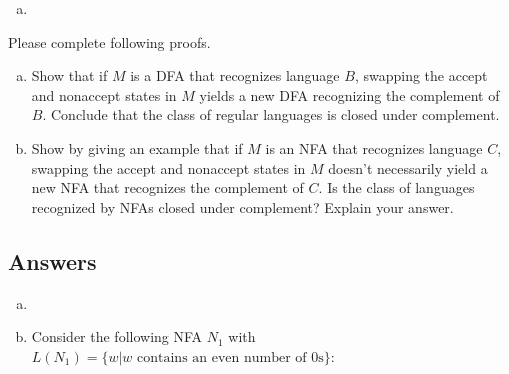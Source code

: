 \documentclass[10pt, legalpaper]{exam}
\begin{document}
\begin{questions}
\begin{enumerate}[(a)]
\begin{tikzpicture}[->,
            >=latex,
            auto,
            node distance=2.5cm,
            semithick,
            baseline=(top.base)]
    \end{tikzpicture}
    
    \item {}    
\end{enumerate}

\newpage
\addpoints
\question[20] Please complete following proofs.
\begin{enumerate}[(a)]
\item {Show that if $M$ is a DFA that recognizes language $B$, swapping the accept and nonaccept states in $M$ yields a new DFA recognizing the complement of $B$. Conclude that the class of regular languages is closed under complement.}
\item {Show by giving an example that if $M$ is an NFA that recognizes language $C$, swapping the accept and nonaccept states in $M$ doesn't necessarily yield a new NFA that recognizes the complement of $C$. Is the class of languages recognized by NFAs closed under complement? Explain your answer.}
\end{enumerate}

\subsection*{Answers}

\begin{enumerate}[(a)]
    \item

    \item Consider the following NFA \(N_{1}\) with \(L(N_{1})=\{w| w \textrm{ contains an even number of 0s}\}\): 
    \begin{center}       
    \begin{tikzpicture}[->,
            >=latex,
            auto,
            node distance=2.5cm,
            semithick,
            baseline=(top.base)]


\end{tikzpicture}
\end{center}
\end{enumerate}
\end{questions}
\end{document}
